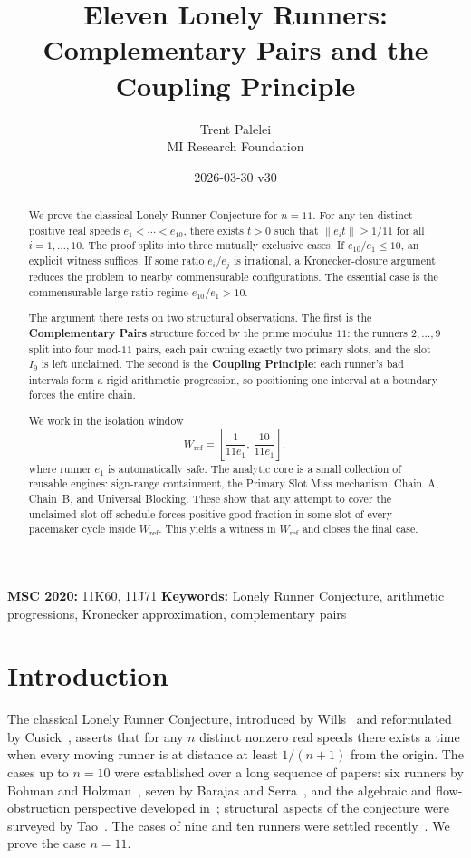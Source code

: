 \documentclass[12pt,a4paper]{amsart}
\title{Eleven Lonely Runners: Complementary Pairs and the Coupling Principle}
\author{Trent Palelei\\[2pt]\small MI Research Foundation}
\date{2026-03-30 \quad v30}
\theoremstyle{definition}
\theoremstyle{remark}
\newcommand{\Wref}{W_{\mathrm{ref}}}
\newcommand{\norm}[1]{\left\|#1\right\|}
\begin{document}
\begin{abstract}
We prove the classical Lonely Runner Conjecture for $n=11$. For any ten distinct positive
real speeds $e_1<\cdots<e_{10}$, there exists $t>0$ such that $\norm{e_i t}\ge 1/11$ for all
$i=1,\ldots,10$. The proof splits into three mutually exclusive cases. If $e_{10}/e_1\le 10$,
an explicit witness suffices. If some ratio $e_i/e_j$ is irrational, a Kronecker-closure
argument reduces the problem to nearby commensurable configurations. The essential case is
the commensurable large-ratio regime $e_{10}/e_1>10$.

The argument there rests on two structural observations. The first is the \textbf{Complementary
Pairs} structure forced by the prime modulus $11$: the runners $2,\dots,9$ split into four
mod-$11$ pairs, each pair owning exactly two primary slots, and the slot $I_9$ is left
unclaimed. The second is the \textbf{Coupling Principle}: each runner's bad intervals form a
rigid arithmetic progression, so positioning one interval at a boundary forces the entire
chain.

We work in the isolation window
\[
  \Wref = \left[\frac{1}{11e_1},\,\frac{10}{11e_1}\right],
\]
where runner $e_1$ is automatically safe. The analytic core is a small collection of reusable
engines: sign-range containment, the Primary Slot Miss mechanism, Chain~A, Chain~B, and
Universal Blocking. These show that any attempt to cover the unclaimed slot off schedule
forces positive good fraction in some slot of every pacemaker cycle inside $\Wref$. This
yields a witness in $\Wref$ and closes the final case.
\end{abstract}

\maketitle

\textbf{MSC 2020:} 11K60, 11J71 \quad
\textbf{Keywords:} Lonely Runner Conjecture, arithmetic progressions,
Kronecker approximation, complementary pairs

\tableofcontents

\section{Introduction}

The classical Lonely Runner Conjecture, introduced by Wills~\cite{Wil67} and reformulated by
Cusick~\cite{Cus73}, asserts that for any $n$ distinct nonzero real speeds there exists a
time when every moving runner is at distance at least $1/(n+1)$ from the origin. The cases
up to $n=10$ were established over a long sequence of papers: six runners by Bohman and
Holzman~\cite{BH01}, seven by Barajas and Serra~\cite{BS08}, and the algebraic and
flow-obstruction perspective developed in~\cite{BGG+98}; structural aspects of the
conjecture were surveyed by Tao~\cite{Tao18}. The cases of nine and ten runners were
settled recently~\cite{Ros25a,Ros25b,Tra25}. We prove the case $n=11$.
\end{document}
